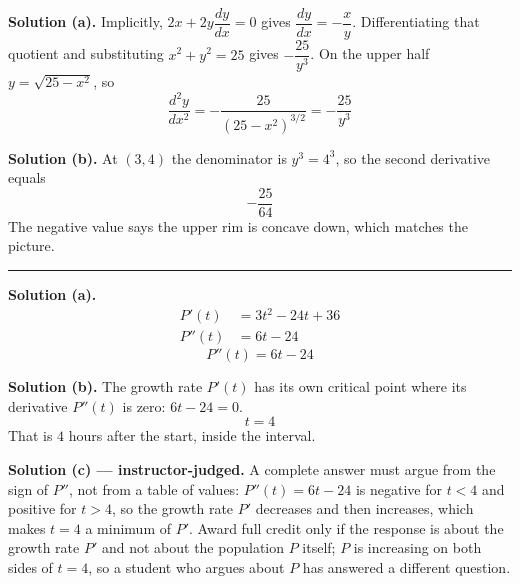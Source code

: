 \documentclass[12pt]{article}
\begin{document}
\textbf{Solution (a).} Implicitly, $2x + 2y\dfrac{dy}{dx} = 0$ gives
$\dfrac{dy}{dx} = -\dfrac{x}{y}$. Differentiating that quotient and
substituting $x^2 + y^2 = 25$ gives $-\dfrac{25}{y^3}$. On the upper half
$y = \sqrt{25 - x^2}$, so
\[ \boxed{\dfrac{d^2y}{dx^2} = -\dfrac{25}{(25 - x^2)^{3/2}} = -\dfrac{25}{y^3}} \]

\textbf{Solution (b).} At $(3, 4)$ the denominator is $y^3 = 4^3$, so the
second derivative equals
\[ \boxed{-\dfrac{25}{64}} \]
The negative value says the upper rim is concave down, which matches the picture.

\vspace{0.2cm}\noindent\rule{\linewidth}{0.2pt}


\textbf{Solution (a).}
\begin{align*}
  P'(t)  &= 3t^2 - 24t + 36 \\
  P''(t) &= 6t - 24
\end{align*}
\[ \boxed{P''(t) = 6t - 24} \]

\textbf{Solution (b).} The growth rate $P'(t)$ has its own critical point where
its derivative $P''(t)$ is zero: $6t - 24 = 0$.
\[ \boxed{t = 4} \]
That is $4$ hours after the start, inside the interval.

\textbf{Solution (c) --- instructor-judged.} A complete answer must argue from
the sign of $P''$, not from a table of values: $P''(t) = 6t - 24$ is negative
for $t < 4$ and positive for $t > 4$, so the growth rate $P'$ decreases and then
increases, which makes $t = 4$ a minimum of $P'$. Award full credit only if the
response is about the growth rate $P'$ and not about the population $P$ itself;
$P$ is increasing on both sides of $t = 4$, so a student who argues about $P$
has answered a different question.
\end{document}
